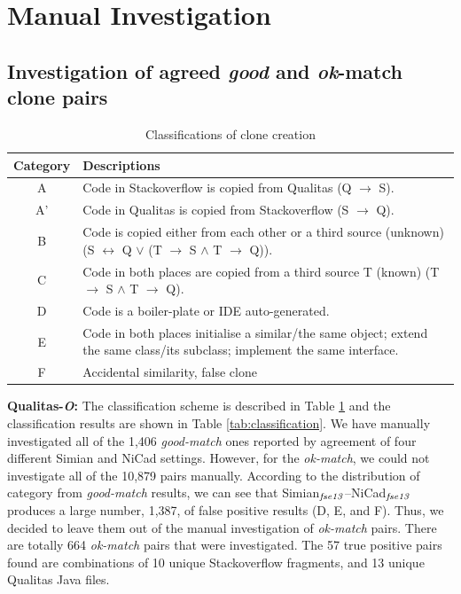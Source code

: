 \documentclass{IEEEtran}
\begin{document}
\section*{Manual Investigation}

\subsection{Investigation of agreed \textit{good} and \textit{ok}-match clone pairs}

\begin{table}[H]
	\centering
	\caption{Classifications of clone creation}
	\label{tab:classification_scheme}
	\begin{tabular}{|c|p{13cm}|}
		\hline 
		Category & Descriptions \\ 
		\hline 
		A & Code in Stackoverflow is copied from Qualitas (Q $\rightarrow$ S). \\ 
		\hline 
		A' & Code in Qualitas is copied from Stackoverflow (S $\rightarrow$ Q). \\ 
		\hline 
		B & Code is copied either from each other or a third source (unknown) (S $\leftrightarrow$ Q $\vee$ (T $\rightarrow$ S $\wedge$ T $\rightarrow$ Q)).
		\\ 
		\hline 
		C & Code in both places are copied from a third source T (known) (T $\rightarrow$ S $\wedge$ T $\rightarrow$ Q).
		\\ 
		\hline 
		D & Code is a boiler-plate or IDE auto-generated.
		\\ 
		\hline 
		E & Code in both places initialise a similar/the same object; extend the same class/its subclass; implement the same interface.
		\\ 
		\hline 
		F & Accidental similarity, false clone \\ 
		\hline 
	\end{tabular} 
\end{table}

\textbf{Qualitas-\textit{O}:} The classification scheme is described in Table \ref{tab:classification_scheme} and the classification results are shown in Table \ref{tab:classification}. We have manually investigated all of the 1,406 \textit{good-match} ones reported by agreement of four different Simian and NiCad settings.  However, for the \textit{ok-match}, we could not investigate all of the 10,879 pairs manually.  According to the distribution of category from \textit{good-match} results, we can see that Simian$_{\textrm{\textit{fse13}}}$--NiCad$_{\textrm{\textit{fse13}}}$ produces a large number, 1,387, of false positive results (D, E, and F). Thus, we decided to leave them out of the manual investigation of \textit{ok-match} pairs. There are totally 664 \textit{ok-match} pairs that were investigated. The 57 true positive pairs found are combinations of 10 unique Stackoverflow fragments, and 13 unique Qualitas Java files.
\end{document}
